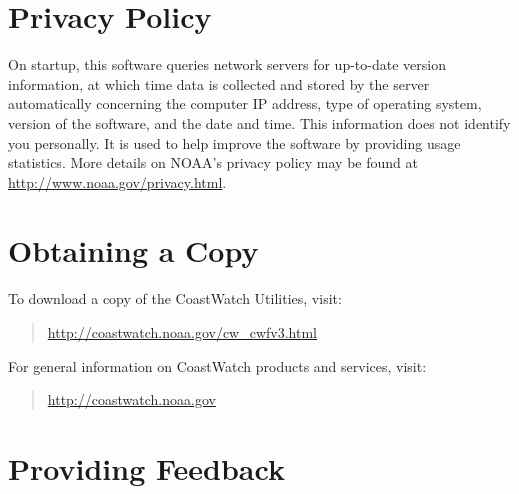 \section*{Privacy Policy}

On startup, this software queries network servers for up-to-date
version information, at which time data is collected and stored by the
server automatically concerning the computer IP address, type of
operating system, version of the software, and the date and time.
This information does not identify you personally.  It is used to help
improve the software by providing usage statistics.  More details on
NOAA's privacy policy may be found at
\url{http://www.noaa.gov/privacy.html}.

\section*{Obtaining a Copy}

To download a copy of the CoastWatch Utilities, visit:
\begin{quote}
  \url{http://coastwatch.noaa.gov/cw\_cwfv3.html}
\end{quote}
For general information on CoastWatch products and services, visit:
\begin{quote}
  \url{http://coastwatch.noaa.gov}
\end{quote}

\section*{Providing Feedback}

